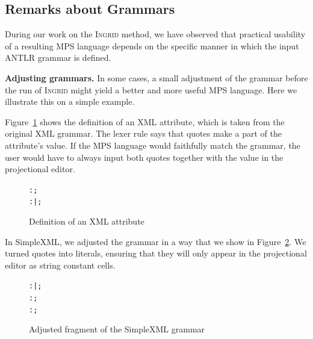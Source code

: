 \subsection{Remarks about Grammars}
\label{sect:REMARKSGRAMMARS}

During our work on the \textsc{Ingrid} method, we have observed that practical usability of a resulting MPS language depends on the specific manner in which the input ANTLR grammar is defined.

\noindent\textbf{Adjusting grammars.}
In some cases, a small adjustment of the grammar before the run of \textsc{Ingrid} might yield a better and more useful MPS language.
Here we illustrate this on a simple example.

Figure~\ref{fig:XMLATTRIB} shows the definition of an XML attribute, which is taken from the original XML grammar.
The lexer rule  says that quotes make a part of the attribute's value.
If the MPS language would faithfully match the grammar, the user would have to always input both quotes together with the value in the projectional editor.

\begin{figure}[ht]
\vspace{-2mm}
\begin{alltt}
\small
   :  \antlrliteral{=}  ;
   :  \antlrregex{~["]*}  |  \antlrregex{~[']*}  ;
\end{alltt}
\caption{Definition of an XML attribute}
\label{fig:XMLATTRIB}
\end{figure}

In SimpleXML, we adjusted the grammar in a way that we show in Figure~\ref{fig:XMLADJUST}.
We turned quotes into literals, ensuring that they will only appear in the projectional editor as string constant cells.

\begin{figure}[ht]
\begin{alltt}
\small
   :     |     ;
   : \antlrregex{~["]*} ;
   : \antlrregex{~[']*} ;
\end{alltt}
\caption{Adjusted fragment of the SimpleXML grammar}
\label{fig:XMLADJUST}
\end{figure}

